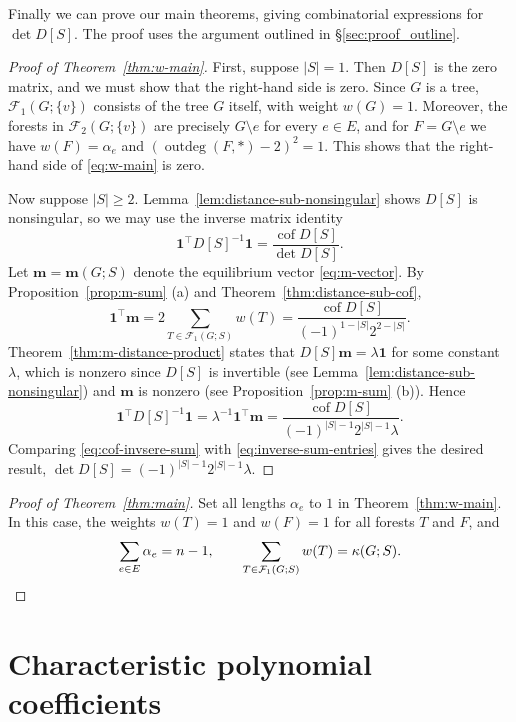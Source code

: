 \documentclass[12pt]{amsart}
\theoremstyle{definition}
\newcommand{\bone}{\mathbf{1}}
\newcommand{\boldm}{\mathbf{m}}
\newcommand{\tr}{\intercal}
\DeclareMathOperator{\cof}{cof}
\newcommand{\trees}{\mathcal{F}_1}
\newcommand{\forests}{\mathcal{F}}
\DeclareMathOperator{\outdeg}{outdeg}
\begin{document}
Finally we can prove our main theorems, giving combinatorial expressions for $\det D[S]$.
The proof uses the argument outlined in \S\ref{sec:proof_outline}.
\begin{proof}[Proof of Theorem~\ref{thm:w-main}]
First, suppose $|S| = 1$.
Then $D[S]$ is the zero matrix, and we must show that the right-hand side is zero.
Since $G$ is a tree, $\trees(G; \{v\})$ consists of the tree $G$ itself, with weight $w({G}) = 1$.
Moreover, the forests in $\forests_2(G; \{v\})$ are precisely $G \setminus e$ for every $e \in E$, and for $F = G \setminus e$ we have 
$w({F}) = \alpha_e$ and
$(\outdeg(F, *) - 2)^2 = 1$.
This shows that the right-hand side of \eqref{eq:w-main} is zero.

Now suppose $|S| \geq 2$.
Lemma~\ref{lem:distance-sub-nonsingular} shows $D[S]$ is nonsingular, so we may use the inverse matrix identity
\begin{equation}\label{eq:cof-invsere-sum}
	\bone^\tr D[S]^{-1} \bone =
	\frac{\cof D[S]}{\det D[S]}. 
\end{equation}
Let $\boldm = \boldm(G; S)$ denote the equilibrium vector \eqref{eq:m-vector}.
By 
Proposition~\ref{prop:m-sum} (a) and Theorem~\ref{thm:distance-sub-cof},
\[
	\bone^\tr \boldm 
	= 2 \sum_{T \in \trees(G;S)} w({T})
	= \frac{\cof D[S]}{(-1)^{1 - |S|} 2^{2 - |S|} }.
\]
Theorem~\ref{thm:m-distance-product} states that $D[S] \boldm = \lambda \bone$
for some constant $\lambda$,
which is nonzero since $D[S]$ is invertible (see Lemma~\ref{lem:distance-sub-nonsingular}) and $\boldm$ is nonzero (see Proposition~\ref{prop:m-sum} (b)).
Hence
\begin{equation}\label{eq:inverse-sum-entries}
	\bone^\tr D[S]^{-1} \bone
	= \lambda^{-1} \bone^\tr \boldm
	= \frac{\cof D[S]}{(-1)^{|S| - 1} 2^{|S| - 1} \lambda} .
\end{equation}
Comparing \eqref{eq:cof-invsere-sum} with \eqref{eq:inverse-sum-entries} gives the desired result,
$\det D[S] = (-1)^{|S| - 1} 2^{|S| - 1} \lambda$.
\end{proof}

\begin{proof}[Proof of Theorem~\ref{thm:main}]
Set all lengths $\alpha_e$ to $1$ in Theorem~\ref{thm:w-main}.
In this case, the weights $w({T}) = 1$ and $w({F}) = 1$ for all forests $T$ and $F$,
and 
\[
	\sum_{e \in E} \alpha_e = n - 1, 
	\qquad \sum_{T \in \trees(G;S)} w({T}) = \kappa(G; S).
	\qedhere
\]
\end{proof}


\section{Characteristic polynomial coefficients}\label{sec:char-poly}
\end{document}
